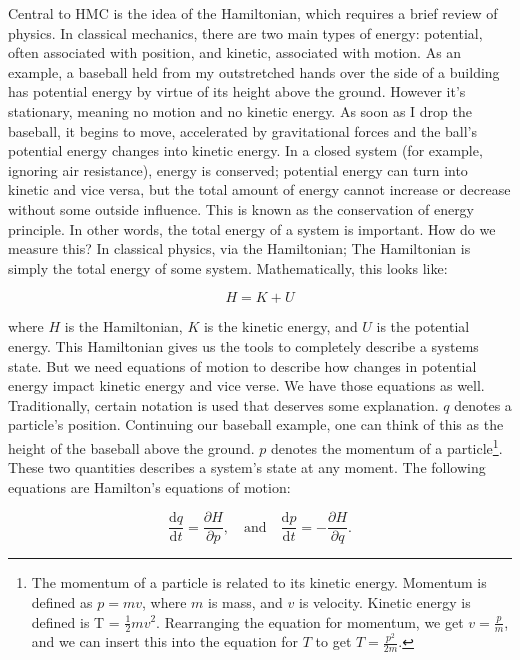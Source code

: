 Central to HMC is the idea of the Hamiltonian, which requires a brief review of physics.  
In classical mechanics, there are two main types of energy: potential, often associated with position, and kinetic, associated with motion.  
As an example, a baseball held from my outstretched hands over the side of a building has potential energy by virtue of its height above the ground.  
However it's stationary, meaning no motion and no kinetic energy.  
As soon as I drop the baseball, it begins to move, accelerated by gravitational forces and the ball's potential energy changes into kinetic energy.  
In a closed system (for example, ignoring air resistance), energy is conserved; potential energy can turn into kinetic and vice versa, but the total amount of energy cannot increase or decrease without some outside influence.  
This is known as the conservation of energy principle.  In other words, the total energy of a system is important.  
How do we measure this?  In classical physics, via the Hamiltonian; 
The Hamiltonian is simply the total energy of some system\cite{taylor_alan_2015}.  
Mathematically, this looks like:

\begin{equation}
    H = K + U
\end{equation}

where \(H\) is the Hamiltonian, \(K\) is the kinetic energy, and \(U\) is the potential energy.  
This Hamiltonian gives us the tools to completely describe a systems state.  
But we need equations of motion to describe how changes in potential energy impact kinetic energy and vice verse.  
We have those equations as well.  
Traditionally, certain notation is used that deserves some explanation.  \(q\) denotes a particle's position.  
Continuing our baseball example, one can think of this as the height of the baseball above the ground.  
\(p\) denotes the momentum of a particle\footnote{The momentum of a particle is related to its kinetic energy.  
Momentum is defined as \(p=mv\), where \(m\) is mass, and \(v\) is velocity.  Kinetic energy is defined is T = \(\frac{1}{2}mv^2\).  
Rearranging the equation for momentum, we get \(v=\frac{p}{m}\), and we can insert this into the equation for \(T\) to get \(T = \frac{p^2}{2m}\).}.  
These two quantities describes a system's state at any moment.  The following equations are Hamilton's equations of motion:

\begin{equation}
    \frac{\mathrm{d}q}{\mathrm{d}t} = 
    \frac{\partial H}{\partial p},
    \quad \text{and} \quad
    \frac{\mathrm{d}p}{\mathrm{d}t} = 
    -\frac{\partial H}{\partial q}.
\end{equation}

